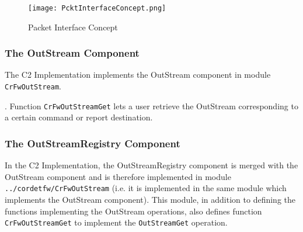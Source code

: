 \documentclass{pnp_article}
\begin{document}
\begin{figure}[ht]
 \centering
 \texttt{[image: PcktInterfaceConcept.png]}
 \caption{Packet Interface Concept}
 \label{fig:PcktInterfaceConcept}
\end{figure}


\subsubsection{The OutStream Component}\label{sec:OutStream}


The C2 Implementation implements the OutStream component in module \texttt{CrFwOutStream}.  

. Function \texttt{CrFwOutStreamGet} lets a user retrieve the OutStream corresponding to a certain command or report destination. 


\subsubsection{The OutStreamRegistry Component}\label{sec:OutStreamRegistry}


In the C2 Implementation, the OutStreamRegistry component is merged with the OutStream component and is therefore implemented in module \texttt{../cordetfw/CrFwOutStream} (i.e. it is implemented in the same module which implements the OutStream component). This module, in addition to defining the functions implementing the OutStream operations, also defines function \texttt{CrFwOutStreamGet} to implement the \texttt{OutStreamGet} operation. 
\end{document}
